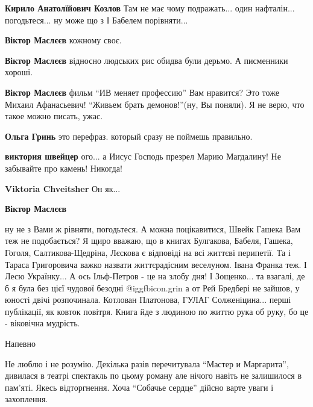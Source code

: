 \begin{itemize}
\begin{itemize} %
\textbf{Кирило Анатолїйович Козлов}
Там не має чому подражать... один нафталін... погодьтеся... ну може що з І Бабелем порівняти...

\begin{itemize} %
\textbf{Віктор Маслєєв} кожному своє.

\textbf{Віктор Маслєєв} відносно людських рис обидва були дерьмо. А писменники хороші.

\textbf{Віктор Маслєєв} фильм \enquote{ИВ меняет профессию} Вам нравится? Это тоже Михаил Афанасьевич! \enquote{Живьем брать демонов!}(ну, Вы поняли). Я не верю, что такое можно писать, ужас.

\textbf{Ольга Гринь} это перефраз. который сразу не поймешь правильно.

\textbf{виктория швейцер} ого... а Иисус Господь презрел Марию Магдалину! Не забывайте про камень! Никогда!

\textbf{Viktoria Chveitsher}
Он як...

\textbf{Віктор Маслєєв} 

ну не з Вами ж рівняти, погодьтеся. А можна поцікавитися, Швейк Гашека Вам теж
не подобається? Я щиро вважаю, що в книгах Булгакова, Бабеля, Гашека, Гоголя,
Салтикова-Щедріна, Лєскова є відповіді на всі життєві перипетії. Та і Тараса
Григоровича важко назвати життєрадісним веселуном. Івана Франка теж. І Лесю
Українку... А ось Ільф-Петров - це на злобу дня! І Зощенко... та взагалі, де б
я була без цієї чудової безодні @igg{fbicon.grin}  а от Рей Бредбері не зайшов, у юності двічі
розпочинала. Котлован Платонова, ГУЛАГ Солженіцина... перші публікації, як
ковток повітря. Книга йде з людиною по життю рука об руку, бо це - віковічна
мудрість.

\end{itemize} %

\end{itemize} %

Напевно


Не люблю і не розумію. Декілька разів перечитувала \enquote{Мастер и Маргарита},
дивилася в театрі спектакль по цьому роману але нічого навіть не залишилося в
пам'яті. Якесь відторгнення. Хоча \enquote{Собачье сердце} дійсно варте уваги і
захоплення.


\end{itemize}
